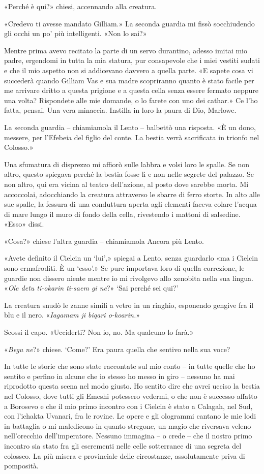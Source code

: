 «Perché è qui?» chiesi, accennando alla creatura.

«Credevo ti avesse mandato Gilliam.» La seconda guardia mi fissò
socchiudendo gli occhi un po' più intelligenti. «Non lo sai?»

Mentre prima avevo recitato la parte di un servo durantino, adesso
imitai mio padre, ergendomi in tutta la mia statura, pur consapevole che
i miei vestiti sudati e che il mio aspetto non si addicevano davvero a
quella parte. «E sapete cosa vi succederà quando Gilliam Vas e sua madre
scopriranno quanto è stato facile per me arrivare dritto a questa
prigione e a questa cella senza essere fermato neppure una volta?
Rispondete alle mie domande, o lo farete con uno dei cathar.» Ce l'ho
fatta, pensai. Una vera minaccia. Instilla in loro la paura di Dio,
Marlowe.

La seconda guardia -- chiamiamola il Lento -- balbettò una risposta. «È
un dono, messere, per l'Efebeia del figlio del conte. La bestia verrà
sacrificata in trionfo nel Colosso.»

Una sfumatura di disprezzo mi affiorò sulle labbra e volsi loro le
spalle. Se non altro, questo spiegava perché la bestia fosse lì e non
nelle segrete del palazzo. Se non altro, qui era vicina al teatro
dell'azione, al posto dove sarebbe morta. Mi accoccolai, adocchiando la
creatura attraverso le sbarre di ferro storte. In alto alle sue spalle,
la fessura di una conduttura aperta agli elementi faceva colare l'acqua
di mare lungo il muro di fondo della cella, rivestendo i mattoni di
salsedine. «Esso» dissi.

«Cosa?» chiese l'altra guardia -- chiamiamola Ancora più Lento.

«Avete definito il Cielcin un `lui',» spiegai a Lento, senza guardarlo
«ma i Cielcin sono ermafroditi. È un `esso'.» Se pure importava loro di
quella correzione, le guardie non dissero niente mentre io mi rivolgevo
allo xenobita nella sua lingua. «\emph{Ole detu ti-okarin ti-saem gi
	ne}?» `Sai perché sei qui?'

La creatura snudò le zanne simili a vetro in un ringhio, esponendo
gengive fra il blu e il nero. «\emph{Iagamam ji biqari o-koarin.}»

Scossi il capo. «Ucciderti? Non io, no. Ma qualcuno lo farà.»

«\emph{Begu ne}?» chiese. `Come?' Era paura quella che sentivo nella sua
voce?

In tutte le storie che sono state raccontate sul mio conto -- in tutte
quelle che ho sentito e perfino in alcune che io stesso ho messo in giro
-- nessuno ha mai riprodotto questa scena nel modo giusto. Ho sentito
dire che avrei ucciso la bestia nel Colosso, dove tutti gli Emeshi
potessero vedermi, o che non è successo affatto a Borosevo e che il mio
primo incontro con i Cielcin è stato a Calagah, nel Sud, con l'ichakta
Uvanari, fra le rovine. Le opere e gli ologrammi cantano le mie lodi in
battaglia o mi maledicono in quanto stregone, un magio che riversava
veleno nell'orecchio dell'imperatore. Nessuno immagina -- o crede -- che
il nostro primo incontro sia stato fra gli escrementi nelle celle
sotterranee di una segreta del colosseo. La più misera e provinciale
delle circostanze, assolutamente priva di pomposità.


